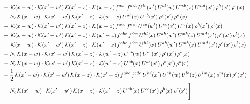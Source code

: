 \documentclass[9pt]{article}
\numberwithin{equation}{section}
\begin{document}
\begin{align}
& +\,\mathcal{K}(x-w)\cdot\mathcal{K}(x'-w')\,\mathcal{K}(x'-z)\cdot\mathcal{K}(w-z)\,f^{abc}\,f^{deh}\,U^{le}(w')\,U^{al}(w)\,U^{mb}(z)\,U^{md}(x')\,\rho^{h}(x')\,\rho^{c}(x)\notag\\
& -N_{c}\,\mathcal{K}(x-w)\cdot\mathcal{K}(x'-w')\,\mathcal{K}(x'-z)\cdot\mathcal{K}(w-z)\,U^{ab}(x)\,U^{cb}(x')\,\rho^{c}(x')\,\rho^{a}(x)\notag\\
& -\,\mathcal{K}(x-w)\cdot\mathcal{K}(x'-w')\,\mathcal{K}(x'-z)\cdot\mathcal{K}(w-z)\,f^{abc}\,f^{deh}\,U^{ea}(w')\,U^{bd}(x')\,U^{lc}(x)\,\rho^{h}(x')\,\rho^{l}(x)\notag\\
& +\,\mathcal{K}(x-w)\cdot\mathcal{K}(x'-w')\,\mathcal{K}(x'-z)\cdot\mathcal{K}(w'-z)\,f^{abc}\,f^{dce}\,U^{hl}(x)\,U^{ah}(w')\,U^{mb}(z)\,U^{md}(x')\,\rho^{e}(x')\,\rho^{l}(x)\notag\\
& -\,\mathcal{K}(x-w)\cdot\mathcal{K}(x'-w')\,\mathcal{K}(x'-z)\cdot\mathcal{K}(w'-z)\,f^{abc}\,f^{dce}\,U^{hl}(w)\,U^{ah}(w')\,U^{mb}(z)\,U^{md}(x')\,\rho^{e}(x')\,\rho^{l}(x)\notag\\
& +N_{c}\,\mathcal{K}(x-w)\cdot\mathcal{K}(x'-w')\,\mathcal{K}(x'-z)\cdot\mathcal{K}(w'-z)\,U^{ab}(w)\,U^{ac}(x')\,\rho^{c}(x')\,\rho^{b}(x)\notag\\
& -N_{c}\,\mathcal{K}(x-w)\cdot\mathcal{K}(x'-w')\,\mathcal{K}(x'-z)\cdot\mathcal{K}(w'-z)\,U^{ab}(x)\,U^{ac}(x')\,\rho^{c}(x')\,\rho^{b}(x)\notag\\
& +\frac{1}{2}\,\mathcal{K}(x'-w)\cdot\mathcal{K}(x'-w')\,\mathcal{K}(x-z)\cdot\mathcal{K}(x'-z)\,f^{abc}\,f^{cde}\,U^{hd}(x')\,U^{ah}(w)\,U^{lb}(z)\,U^{lm}(x)\,\rho^{m}(x)\,\rho^{e}(x')\notag\\
& -N_{c}\,\mathcal{K}(x'-w)\cdot\mathcal{K}(x'-w')\,\mathcal{K}(x-z)\cdot\mathcal{K}(x'-z)\,U^{ab}(x)\,U^{ca}(x')\,\rho^{b}(x)\,\rho^{c}(x')\Bigg]
\end{align}
\end{document}
